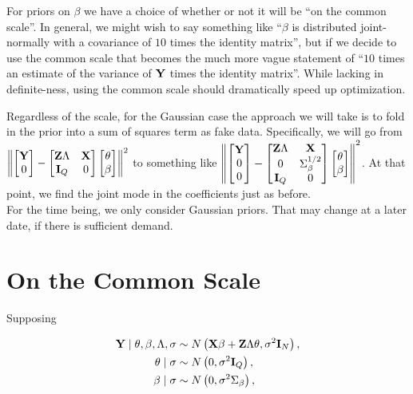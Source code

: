 \documentclass[10pt]{article}
\begin{document}
For priors on $\beta$ we have a choice of whether or not it will be
``on the common scale''. In general, we might wish to say something
like ``$\beta$ is distributed joint-normally with a covariance of $10$
times the identity matrix'', but if we decide to use the common scale
that becomes the much more vague statement of ``$10$ times an estimate
of the variance of ${\bf Y}$ times the identity matrix''. While
lacking in definite-ness, using the common scale should dramatically
speed up optimization.

Regardless of the scale, for the Gaussian case the approach we will take
is to fold in the prior into a sum of squares term as fake
data. Specifically, we will go from
$\left\| \begin{bmatrix}{\bf Y} \\ 0\end{bmatrix}
-\begin{bmatrix} {\bf Z}\Lambda & {\bf X} \\ {\bf I}_Q &
  0\end{bmatrix} \begin{bmatrix}\theta \\ \beta\end{bmatrix}
\right\|^2$ to something like 
$\left\| \begin{bmatrix}{\bf Y} \\ 0 \\ 0\end{bmatrix}
-\begin{bmatrix} {\bf Z}\Lambda & {\bf X} \\ 0 & \Sigma_\beta^{1/2} \\
  {\bf I}_Q &
  0\end{bmatrix} \begin{bmatrix}\theta \\ \beta\end{bmatrix}
\right\|^2$. At that point, we find the joint mode in the coefficients
just as before. \\

For the time being, we only consider Gaussian priors. That may change
at a later date, if there is sufficient demand.

\section*{On the Common Scale}

Supposing

\begin{align*}
{\bf Y} \mid \theta, \beta, \Lambda, \sigma &
\sim
N\left({\bf X}\beta + {\bf Z}\Lambda\theta, \sigma^2{\bf I}_N\right),
\\
\theta \mid \sigma & \sim N\left(0,
  \sigma^2{\bf I}_Q\right), \\
\beta \mid \sigma & \sim N\left(0,
  \sigma^2\Sigma_\beta\right),
\end{align*}
\end{document}
